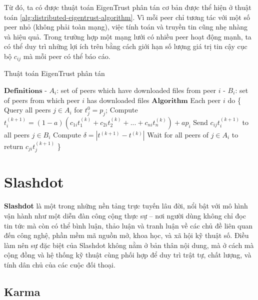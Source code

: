 Từ đó, ta có được thuật toán EigenTrust phân tán cơ bản được thể hiện ở thuật toán \ref{alg:distributed-eigentrust-algorithm}.
Vì mỗi peer chỉ tương tác với một số peer nhỏ (không phải toàn mạng), việc tính toán và truyền tin cũng nhẹ nhàng và hiệu quả.
Trong trường hợp một mạng lưới có nhiều peer hoạt động mạnh, ta có thể duy trì những lợi ích trên bằng cách giới hạn số lượng giá trị tin cậy cục bộ $c_{ij}$ mà mỗi peer
có thể báo cáo.

\begin{algorithm}
  \caption{Thuật toán EigenTrust phân tán}
  \label{alg:distributed-eigentrust-algorithm}
  \begin{algorithmic}
    \State $\textbf{Definitions}$
    \State \hspace{1em}- $A_i$: set of peers which have downloaded files from peer $i$
    \State \hspace{1em}- $B_i$: set of peers from which peer $i$ has downloaded files
    \State $\textbf{Algorithm}$
    \State Each peer $i$ do \{
    \State Query all peers $j \in A_i$ for $t_j^{0} = p_j$;
    \Repeat
    \State Compute $t_i^{(k+1)} = (1 - a)(c_{1i}t_1^{(k)} + c_{2i}t_2^{(k)} + ... + c_{ni}t_n^{(k)}) + ap_i$
    \State Send $c_{ij}t_i^{(k+1)}$ to all peers $j \in B_i$
    \State Compute $\delta = | t^{(k+1)} - t^{(k)} |$
    \State Wait for all peers of $j \in A_i$ to return $c_{ji}t_j^{(k+1)}$
    \Until{$\delta < \epsilon$}
    \State \}
  \end{algorithmic}
\end{algorithm}

\section{Slashdot}

\textbf{Slashdot} \cite{slashdot-web} là một trong những nền tảng trực tuyến lâu đời, nổi bật với mô hình vận hành như một diễn đàn công cộng thực sự -- nơi người dùng không chỉ đọc tin tức mà còn có thể bình luận,
thảo luận và tranh luận về các chủ đề liên quan đến công nghệ, phần mềm mã nguồn mở, khoa học, và xã hội kỹ thuật số.
Điều làm nên sự đặc biệt của Slashdot không nằm ở bản thân nội dung, mà ở cách mà cộng đồng và hệ thống kỹ thuật cùng phối hợp để duy trì trật tự, chất lượng, và tính dân chủ của các cuộc đối thoại.

\subsection{Karma}

